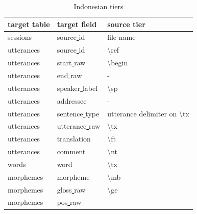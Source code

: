 \documentclass[a4paper, 11pt]{book}
\newcommand{\bks}{\textbackslash}	%
\newcommand{\und}{\underline{{ }}\hspace{0.2mm}}	%
\begin{document}
\begin{table}[ht!]
	\centering
	\begin{tabular}{lll}
		\toprule
			\textbf{target table} & \textbf{target field} & \textbf{source tier} \\
		\midrule
			sessions 	& source\und id 	& file name \\
			utterances 	& source\und id	& \bks ref \\
			utterances 	& start\und raw		& \bks begin \\
			utterances 	& end\und raw		& - \\
			utterances 	& speaker\und label	& \bks sp \\
			utterances 	& addressee			& - \\
			utterances 	& sentence\und type	& utterance delimiter on \bks tx \\
			utterances 	& utterance\und raw	& \bks tx \\
			utterances 	& translation		& \bks ft \\
			utterances 	& comment			& \bks nt \\

			words	 	& word		& \bks tx \\
			morphemes	& morpheme			& \bks mb \\
			morphemes	& gloss\und raw		& \bks ge \\ %
			morphemes	& pos\und raw		& - \\

		\bottomrule
	\end{tabular}
	\caption{Indonesian tiers}
	\label{tab:Indonesian tiers}
\end{table}
\end{document}
